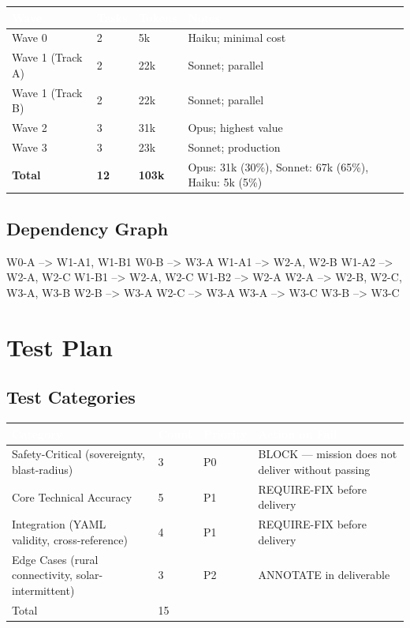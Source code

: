 \documentclass[11pt,letterpaper]{article}
\newcommand{\tableheader}[1]{\textbf{\sffamily\textcolor{white}{#1}}}
\begin{document}
\begin{center}
\begin{tabularx}{\textwidth}{L{3cm}C{2.5cm}C{2.5cm}X}
\toprule
{}
\tableheader{Wave} & \tableheader{Tasks} & \tableheader{Tokens} & \tableheader{Notes} \\
\midrule
Wave 0 & 2 & 5k & Haiku; minimal cost \\
Wave 1 (Track A) & 2 & 22k & Sonnet; parallel \\
Wave 1 (Track B) & 2 & 22k & Sonnet; parallel \\
Wave 2 & 3 & 31k & Opus; highest value \\
Wave 3 & 3 & 23k & Sonnet; production \\
\midrule
{}
\textbf{Total} & \textbf{12} & \textbf{103k} & Opus: 31k (30\%), Sonnet: 67k (65\%), Haiku: 5k (5\%) \\
\bottomrule
\end{tabularx}
\end{center}

\subsection{Dependency Graph}

\begin{asciibox}
  W0-A --> W1-A1, W1-B1
  W0-B --> W3-A
  W1-A1 --> W2-A, W2-B
  W1-A2 --> W2-A, W2-C
  W1-B1 --> W2-A, W2-C
  W1-B2 --> W2-A
  W2-A --> W2-B, W2-C, W3-A, W3-B
  W2-B --> W3-A
  W2-C --> W3-A
  W3-A --> W3-C
  W3-B --> W3-C
\end{asciibox}

\section{Test Plan}

\subsection{Test Categories}

\begin{center}
\begin{tabularx}{\textwidth}{L{3.5cm}C{1.5cm}L{2cm}X}
\toprule
{}
\tableheader{Category} & \tableheader{Count} & \tableheader{Priority} & \tableheader{Action on Fail} \\
\midrule
Safety-Critical (sovereignty, blast-radius) & 3 & P0 & BLOCK --- mission does not deliver without passing \\
Core Technical Accuracy & 5 & P1 & REQUIRE-FIX before delivery \\
Integration (YAML validity, cross-reference) & 4 & P1 & REQUIRE-FIX before delivery \\
Edge Cases (rural connectivity, solar-intermittent) & 3 & P2 & ANNOTATE in deliverable \\
\midrule
Total & 15 & & \\
\bottomrule
\end{tabularx}
\end{center}
\end{document}
